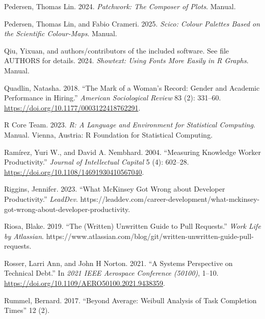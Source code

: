 \documentclass[
]{article}
\newlength{\cslhangindent}
\newenvironment{CSLReferences}[2] %
 {\begin{list}{}{%
  \setlength{\itemindent}{0pt}
  \setlength{\leftmargin}{0pt}
  \setlength{\parsep}{0pt}
  \ifodd #1
   \setlength{\leftmargin}{\cslhangindent}
   \setlength{\itemindent}{-1\cslhangindent}
  \fi
  \setlength{\itemsep}{#2\baselineskip}}}
 {\end{list}}
\begin{document}
\begin{CSLReferences}{1}{0}
Pedersen, Thomas Lin. 2024. \emph{Patchwork: {The} Composer of Plots}.
Manual.

Pedersen, Thomas Lin, and Fabio Crameri. 2025. \emph{Scico: {Colour}
Palettes Based on the Scientific Colour-Maps}. Manual.

Qiu, Yixuan, and authors/contributors of the included software. See file
AUTHORS for details. 2024. \emph{Showtext: {Using} Fonts More Easily in
{R} Graphs}. Manual.

Quadlin, Natasha. 2018. {``The {Mark} of a {Woman}'s {Record}: {Gender}
and {Academic Performance} in {Hiring}.''} \emph{American Sociological
Review} 83 (2): 331--60. \url{https://doi.org/10.1177/0003122418762291}.

R Core Team. 2023. \emph{R: A Language and Environment for Statistical
Computing}. Manual. Vienna, Austria: R Foundation for Statistical
Computing.

Ramírez, Yuri W., and David A. Nembhard. 2004. {``Measuring Knowledge
Worker Productivity.''} \emph{Journal of Intellectual Capital} 5 (4):
602--28. \url{https://doi.org/10.1108/14691930410567040}.

Riggins, Jennifer. 2023. {``What {McKinsey} Got Wrong about Developer
Productivity.''} \emph{LeadDev}.
https://leaddev.com/career-development/what-mckinsey-got-wrong-about-developer-productivity.

Riosa, Blake. 2019. {``The (Written) Unwritten Guide to Pull
Requests.''} \emph{Work Life by Atlassian}.
https://www.atlassian.com/blog/git/written-unwritten-guide-pull-requests.

Rosser, Larri Ann, and John H Norton. 2021. {``A {Systems Perspective}
on {Technical Debt}.''} In \emph{2021 {IEEE Aerospace Conference}
(50100)}, 1--10. \url{https://doi.org/10.1109/AERO50100.2021.9438359}.

Rummel, Bernard. 2017. {``Beyond {Average}: {Weibull Analysis} of {Task
Completion Times}''} 12 (2).


\end{CSLReferences}
\end{document}
